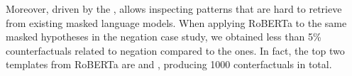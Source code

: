 Moreover, driven by the \tagstrs, \sysname allows inspecting patterns that are hard to retrieve from existing masked language models.
When applying RoBERTa to the same masked hypotheses in the negation case study, we obtained less than 5\% counterfactuals related to negation compared to the \sysname ones.
In fact,  the top two templates from RoBERTa are \texttt{} and \texttt{}, producing 1000 conterfactuals in total.

